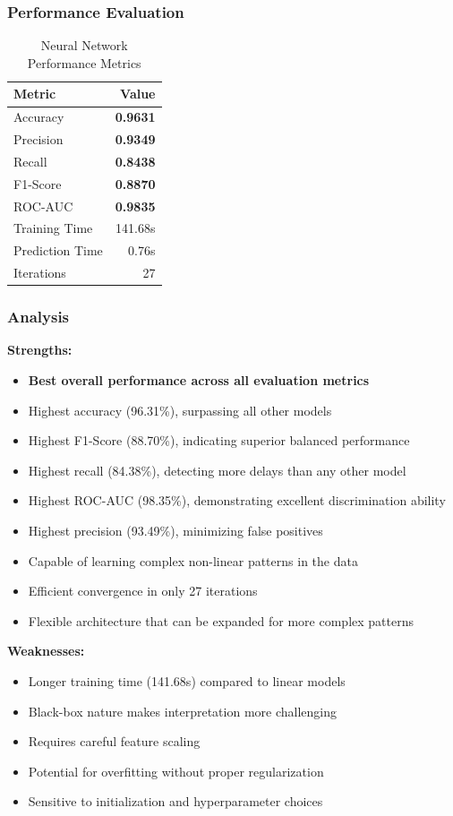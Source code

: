 \documentclass[sigconf]{acmart}
\begin{document}
\subsubsection{Performance Evaluation}
\begin{table}[h]
\centering
\caption{Neural Network Performance Metrics}
\begin{tabular}{lr}
\toprule
Metric & Value \\
\midrule
Accuracy & \textbf{0.9631} \\
Precision & \textbf{0.9349} \\
Recall & \textbf{0.8438} \\
F1-Score & \textbf{0.8870} \\
ROC-AUC & \textbf{0.9835} \\
Training Time & 141.68s \\
Prediction Time & 0.76s \\
Iterations & 27 \\
\bottomrule
\end{tabular}
\end{table}

\subsubsection{Analysis}
\textbf{Strengths:}
\begin{itemize}
    \item \textbf{Best overall performance across all evaluation metrics}
    \item Highest accuracy (96.31\%), surpassing all other models
    \item Highest F1-Score (88.70\%), indicating superior balanced performance
    \item Highest recall (84.38\%), detecting more delays than any other model
    \item Highest ROC-AUC (98.35\%), demonstrating excellent discrimination ability
    \item Highest precision (93.49\%), minimizing false positives
    \item Capable of learning complex non-linear patterns in the data
    \item Efficient convergence in only 27 iterations
    \item Flexible architecture that can be expanded for more complex patterns
\end{itemize}

\textbf{Weaknesses:}
\begin{itemize}
    \item Longer training time (141.68s) compared to linear models
    \item Black-box nature makes interpretation more challenging
    \item Requires careful feature scaling
    \item Potential for overfitting without proper regularization
    \item Sensitive to initialization and hyperparameter choices
\end{itemize}
\end{document}
